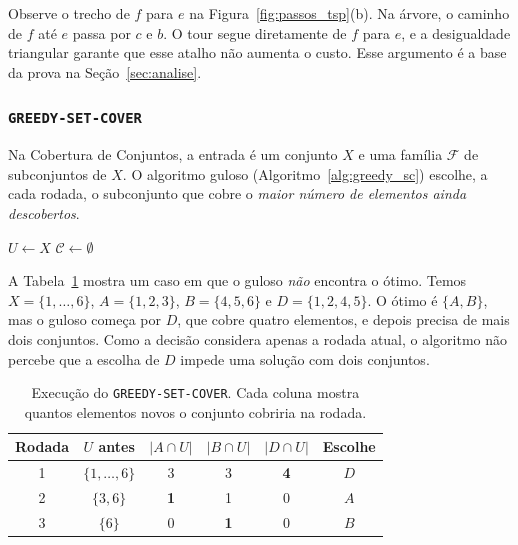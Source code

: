 \documentclass[conference]{IEEEtran}
\theoremstyle{definition}
\theoremstyle{plain}
\begin{document}
Observe o trecho de $f$ para $e$ na Figura~\ref{fig:passos_tsp}(b). Na árvore, o caminho de $f$ até $e$ passa por $c$ e $b$. O tour segue diretamente de $f$ para $e$, e a desigualdade triangular garante que esse atalho não aumenta o custo. Esse argumento é a base da prova na Seção~\ref{sec:analise}.

\subsubsection{\texttt{GREEDY-SET-COVER}}

Na Cobertura de Conjuntos, a entrada é um conjunto $X$ e uma família $\mathcal{F}$ de subconjuntos de $X$. O algoritmo guloso (Algoritmo~\ref{alg:greedy_sc}) escolhe, a cada rodada, o subconjunto que cobre o \textit{maior número de elementos ainda descobertos}.

\begin{algorithm}[htbp]
\caption{\texttt{GREEDY-SET-COVER}$(X, \mathcal{F})$ \cite{cormen2012algoritmos}}
\label{alg:greedy_sc}
$U \leftarrow X$ 
$\mathcal{C} \leftarrow \emptyset$\;
\;
\end{algorithm}

A Tabela~\ref{tab:passos_sc} mostra um caso em que o guloso \textit{não} encontra o ótimo. Temos $X = \{1,\dots,6\}$, $A = \{1,2,3\}$, $B = \{4,5,6\}$ e $D = \{1,2,4,5\}$. O ótimo é $\{A, B\}$, mas o guloso começa por $D$, que cobre quatro elementos, e depois precisa de mais dois conjuntos. Como a decisão considera apenas a rodada atual, o algoritmo não percebe que a escolha de $D$ impede uma solução com dois conjuntos.

\begin{table}[htbp]
\centering
\caption{Execução do \texttt{GREEDY-SET-COVER}. Cada coluna mostra quantos elementos novos o conjunto cobriria na rodada.}
\label{tab:passos_sc}
\footnotesize
\begin{tabular}{@{}cccccc@{}}
\toprule
Rodada & $U$ antes & $|A \cap U|$ & $|B \cap U|$ & $|D \cap U|$ & Escolhe \\
\midrule
1 & $\{1,\dots,6\}$ & 3 & 3 & \textbf{4} & $D$ \\
2 & $\{3,6\}$ & \textbf{1} & 1 & 0 & $A$ \\
3 & $\{6\}$ & 0 & \textbf{1} & 0 & $B$ \\
\bottomrule
\end{tabular}
\end{table}
\end{document}
